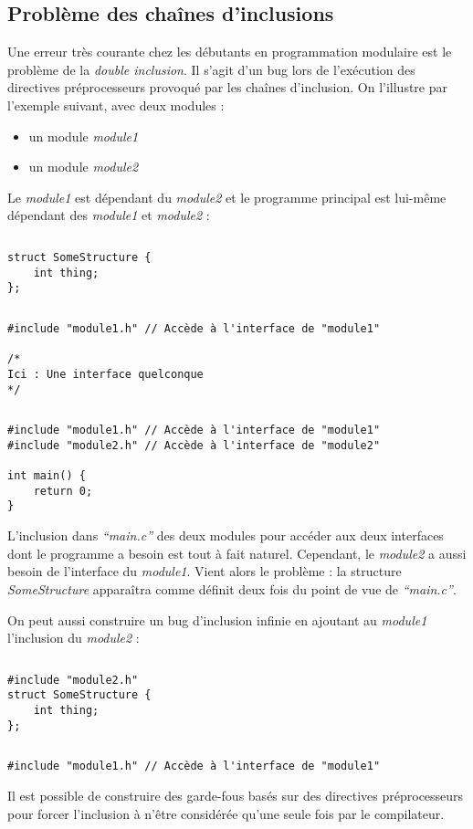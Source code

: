 \documentclass[../../../main.tex]{subfiles}
\begin{document}
\subsection{Problème des chaînes d'inclusions}
\label{sub:probl_me_des_cha_nes_d_inclusions}
Une erreur très courante chez les débutants en programmation modulaire est le problème de la \textit{double inclusion}. Il s'agit d'un bug lors de l'exécution des directives préprocesseurs provoqué par les chaînes d'inclusion. On l'illustre par l'exemple suivant, avec deux modules :
\begin{itemize}
	\item un module \textit{module1}
	\item un module \textit{module2}
\end{itemize}
Le \textit{module1} est dépendant du \textit{module2} et le programme principal est lui-même dépendant des \textit{module1} et \textit{module2} :
\begin{lstlisting}[title=module1.h]
\end{lstlisting}
\begin{verbatim}
struct SomeStructure {
	int thing;
};
\end{verbatim}
\begin{lstlisting}[title=module2.h]
\end{lstlisting}
\begin{verbatim}
#include "module1.h" // Accède à l'interface de "module1"

/*
Ici : Une interface quelconque
*/
\end{verbatim}
\begin{lstlisting}[title=main.c]
\end{lstlisting}
\begin{verbatim}
#include "module1.h" // Accède à l'interface de "module1"
#include "module2.h" // Accède à l'interface de "module2"

int main() {
	return 0;
}
\end{verbatim}
L'inclusion dans \textit{``main.c''} des deux modules pour accéder aux deux interfaces dont le programme a besoin est tout à fait naturel. Cependant, le \textit{module2} a aussi besoin de l'interface du \textit{module1}. Vient alors le problème : la structure \textit{SomeStructure} apparaîtra comme définit deux fois du point de vue de \textit{``main.c''}.
 
On peut aussi construire un bug d'inclusion infinie en ajoutant au \textit{module1} l'inclusion du \textit{module2} :
\begin{lstlisting}[title=module1.h]
\end{lstlisting}
\begin{verbatim}
#include "module2.h"
struct SomeStructure {
	int thing;
};
\end{verbatim}
\begin{lstlisting}[title=module2.h]
\end{lstlisting}
\begin{verbatim}
#include "module1.h" // Accède à l'interface de "module1"
\end{verbatim}
Il est possible de construire des garde-fous basés sur des directives préprocesseurs pour forcer l'inclusion à n'être considérée qu'une seule fois par le compilateur.
\end{document}
